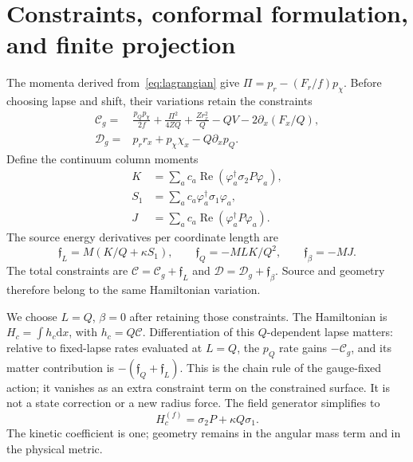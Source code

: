 \documentclass[11pt]{article}
\newcommand{\dd}{\mathrm{d}}
\begin{document}
\section{Constraints, conformal formulation, and finite projection}\label{sec:constraints}
The momenta derived from~\eqref{eq:lagrangian} give
$\Pi=p_r-(F_r/f)p_\chi$. Before choosing lapse and shift, their variations
retain the constraints
\begin{align}\label{eq:constraints}
\mathcal C_g={}&\frac{p_Qp_\chi}{2f}+\frac{\Pi^2}{4ZQ}
 +\frac{Zr_x^2}{Q}-QV-2\partial_x(F_x/Q),\\
\mathcal D_g={}&p_rr_x+p_\chi\chi_x-Q\partial_xp_Q.\nonumber
\end{align}
Define the continuum column moments
\begin{align*}
K&=\sum_a c_a\operatorname{Re}(\varphi_a^\dagger\sigma_2P\varphi_a),\\
S_1&=\sum_a c_a\varphi_a^\dagger\sigma_1\varphi_a,\\
J&=\sum_a c_a\operatorname{Re}(\varphi_a^\dagger P\varphi_a).
\end{align*}
The source energy derivatives per coordinate length are
\begin{equation}\label{eq:forces}
\mathfrak f_L=M(K/Q+\kappa S_1),\qquad
\mathfrak f_Q=-MLK/Q^2,\qquad \mathfrak f_\beta=-MJ.
\end{equation}
The total constraints are $\mathcal C=\mathcal C_g+\mathfrak f_L$ and
$\mathcal D=\mathcal D_g+\mathfrak f_\beta$. Source and geometry therefore
belong to the same Hamiltonian variation.

We choose $L=Q$, $\beta=0$ after retaining those constraints. The
Hamiltonian is $H_c=\int h_c\dd x$, with $h_c=Q\mathcal C$.
Differentiation of this $Q$-dependent lapse matters: relative to fixed-lapse
rates evaluated at $L=Q$, the $p_Q$ rate gains $-\mathcal C_g$, and its
matter contribution is $-(\mathfrak f_Q+\mathfrak f_L)$.
This is the chain rule of the gauge-fixed action; it vanishes as an extra
constraint term on the constrained surface. It is not a state correction
or a new radius force. The field generator simplifies to
\begin{equation}\label{eq:conformaldirac}
H_c^{(f)}=\sigma_2P+\kappa Q\sigma_1.
\end{equation}
The kinetic coefficient is one; geometry remains in the angular mass
term and in the physical metric.
\end{document}

